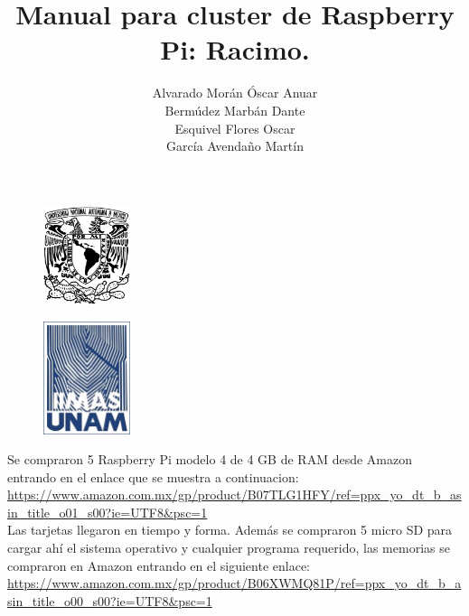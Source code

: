 \documentclass[twocolumn, letterpaper,aps,pra,10pt]{revtex4-1}
\begin{document}
\renewcommand{\figurename}{{\bf Figura }}
\renewcommand{\tablename}{{\bf Tabla}}
\renewcommand{\thesection}{\arabic{section}}
\renewcommand{\thesubsection}{\arabic{subsection}}

\begin{figure}
\flushleft \includegraphics[width=1in]{unam_logo.jpg}
\end{figure}
\begin{figure}
\flushright \includegraphics[width=1in]{iimas.jpg}
\end{figure}

\lhead{}
\rhead{}
\cfoot{\thepage}
\rfoot{}

\vspace*{-1cm}
\title{Manual para cluster de Raspberry Pi: Racimo.}
\author{Alvarado Morán Óscar Anuar \\Bermúdez Marbán Dante \\Esquivel Flores Oscar \\García Avendaño Martín}

\maketitle
Se compraron 5 Raspberry Pi modelo 4 de 4 GB de RAM desde Amazon entrando en el enlace que se muestra a continuacion:\\
\url{https://www.amazon.com.mx/gp/product/B07TLG1HFY/ref=ppx_yo_dt_b_asin_title_o01_s00?ie=UTF8&psc=1} \\

Las tarjetas llegaron en tiempo y forma. Además se compraron 5 micro SD para cargar ahí el sistema operativo y cualquier programa requerido, las memorias se compraron en Amazon entrando en el siguiente enlace: \\
\url{https://www.amazon.com.mx/gp/product/B06XWMQ81P/ref=ppx_yo_dt_b_asin_title_o00_s00?ie=UTF8&psc=1} \\
 
\end{document}
